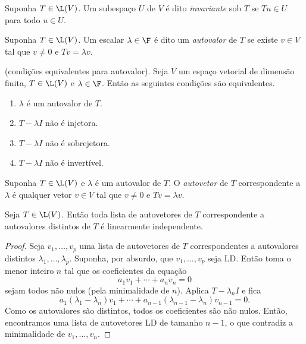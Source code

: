 \documentclass{article}
\begin{document}
\begin{defn}
    Suponha \(T \in \L(V)\). Um subespaço \(U\) de \(V\) é dito \emph{invariante} sob \(T\) se \(Tu \in U\) para todo \(u \in U\).
\end{defn}

\begin{defn}
    Suponha \(T \in \L(V)\). Um escalar \(\lambda \in \F\) é dito um \emph{autovalor} de \(T\) se existe \(v \in V\) tal que \(v \neq 0\) e \(Tv = \lambda v\). 
\end{defn}

\begin{prop} (condições equivalentes para autovalor).
    Seja \(V\) um espaço vetorial de dimensão finita, \(T \in \L(V)\) e \(\lambda \in \F\). Então as seguintes condições são equivalentes.
    \begin{enumerate}
        \item[(a)] \(\lambda\) é um autovalor de \(T\).
        \item[(b)] \(T - \lambda I\) não é injetora.
        \item[(c)] \(T - \lambda I\) não é sobrejetora.
        \item[(d)] \(T - \lambda I\) não é invertível.
    \end{enumerate}
\end{prop}

\begin{defn}
    Suponha \(T \in \L(V)\) e \(\lambda\) é um autovalor de \(T\). O \emph{autovetor} de \(T\) correspondente a \(\lambda\) é qualquer vetor \(v \in V\) tal que \(v \neq 0\) e \(Tv = \lambda v\).
\end{defn}

\begin{thm}
    Seja \(T \in \L(V)\). Então toda lista de autovetores de \(T\) correspondente a autovalores distintos de \(T\) é linearmente independente.
\end{thm}

\begin{proof}
    Seja \(v_1, \ldots, v_p\) uma lista de autovetores de \(T\) correspondentes a autovalores distintos \(\lambda_1, \ldots, \lambda_p\). Suponha, por absurdo, que \(v_1, \ldots, v_p\) seja LD. Então toma o menor inteiro \(n\) tal que os coeficientes da equação
    \[
        a_1 v_1 + \cdots + a_n v_n = 0
    \]
    sejam todos não nulos (pela minimalidade de \(n\)). Aplica \(T - \lambda_n I\) e fica 
    \[
        a_1 (\lambda_1 - \lambda_n) v_1 + \cdots + a_{n-1} (\lambda_{n-1} - \lambda_n)v_{n-1} = 0.
    \]
    Como os autovalores são distintos, todos os coeficientes são não nulos. Então, encontramos uma lista de autovetores LD de tamanho \(n-1\), o que contradiz a minimalidade de \(v_1, \ldots, v_n\).
\end{proof}
\end{document}
